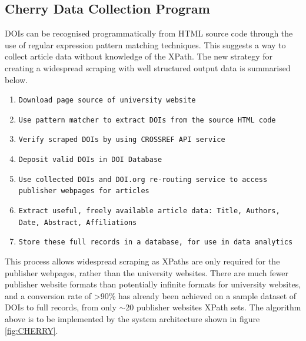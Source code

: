 \documentclass[11pt, oneside]{article}   	%
\begin{document}
\subsection{Cherry Data Collection Program}
\label{sec:CHERRY}
DOIs can be recognised programmatically from HTML source code through the use of regular expression pattern matching techniques. This suggests a way to collect article data without knowledge of the XPath. 
The new strategy for creating a widespread scraping with well structured output data is summarised below.
\begin{sloppypar}
\begin{enumerate}
\item \texttt{Download page source of university website}
\item \texttt{Use pattern matcher to extract DOIs from the source HTML code}
\item \texttt{Verify scraped DOIs by using CROSSREF API service}
\item \texttt{Deposit valid DOIs in DOI Database}
\item \texttt{Use collected DOIs and DOI.org re-routing service  to access publisher webpages for articles}
\item \texttt{Extract useful, freely available article data: Title, Authors, Date, Abstract, Affiliations}
\item \texttt{Store these full records in a database, for use in data analytics}
\end{enumerate}
\end{sloppypar}
This process allows widespread scraping as XPaths are only required for the publisher webpages, rather than the university websites. There are much fewer publisher website formats than potentially infinite formats for university websites, and a conversion rate of \textgreater 90\% has already been achieved on a sample dataset of DOIs to full records, from only $\sim$20 publisher websites XPath sets. 
The algorithm above is to be implemented by the system architecture shown in figure \ref{fig:CHERRY}.
\end{document}

